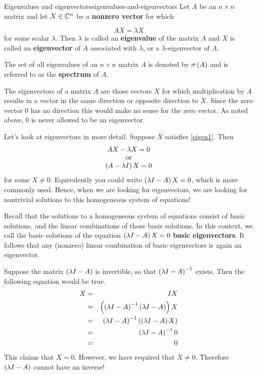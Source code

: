 \begin{definition}{Eigenvalues and eigenvectors}{eigenvalues-and-eigenvectors}
Let $A$ be an $n\times n$ matrix and let $X \in \mathbb{C}^{n}$ be a
\textbf{nonzero vector} for which

\begin{equation}
AX=\lambda X  \label{eigen1}
\end{equation}
for some scalar $\lambda .$ Then $\lambda $ is called an
\textbf{eigenvalue}
of the matrix $A$ and $X$ is called an \textbf{eigenvector} of $A$ associated with $\lambda$, or a $\lambda$-eigenvector of $A$. 
 
The set of all eigenvalues of an $n\times n$ matrix $A$ is denoted by 
$\sigma \left(A\right) $ and is referred to as the \textbf{spectrum} of $A.$
\end{definition}

The eigenvectors of a matrix $A$ are those vectors $X$ for which
multiplication by $A$ results in a vector in the same direction or opposite
direction to $X$. Since the zero vector $0$ has no
direction this would make no sense for the zero vector. As noted above, 
$0$ is never allowed to be an eigenvector. 

Let's look at eigenvectors in more detail. Suppose $X$ satisfies \ref{eigen1}. Then
\begin{equation*}
\begin{array}{c}
AX - \lambda X = 0 \\
\mbox{or} \\
\left(A-\lambda I\right) X = 0
\end{array}
\end{equation*}
for some $X \neq 0.$ Equivalently you could write $\left(\lambda
I-A\right)X = 0$, which is more commonly used.  Hence, when we are looking for eigenvectors, we are
looking for nontrivial solutions to this homogeneous system of equations!

Recall that the solutions to a homogeneous system of equations consist
of basic solutions, and the linear combinations of those basic
solutions. In this context, we call the basic solutions of the
equation $\left(\lambda I - A\right) X = 0$ \textbf{basic
eigenvectors}. It follows that any (nonzero) linear combination of basic
eigenvectors is again an eigenvector.

Suppose the matrix $\left(\lambda I - A\right)$ is invertible, so that
$\left(\lambda I - A\right)^{-1}$ exists.
Then the following equation would be true.
\begin{eqnarray*}
X &=& IX \\
&=& \left(\left(\lambda I - A\right) ^{-1}\left(\lambda I - A \right)
\right) X \\
&=&\left(\lambda I - A\right) ^{-1}\left(\left(\lambda
I - A\right) X\right) \\
&=& \left(\lambda I - A\right) ^{-1}0 \\
&=& 0
\end{eqnarray*}
This claims that $X=0$. However, we have required that $ X \neq 0$. Therefore  $\left(\lambda I - A\right)$
cannot have an inverse! 

